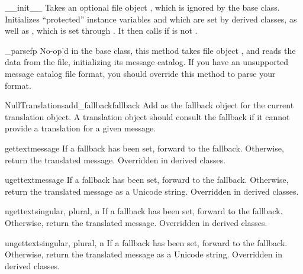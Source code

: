 \begin{methoddesc}[NullTranslations]{__init__}{}
Takes an optional file object , which is ignored by the base
class.  Initializes ``protected'' instance variables  and
 which are set by derived classes, as well as ,
which is set through .  It then calls
 if  is not .
\end{methoddesc}

\begin{methoddesc}[NullTranslations]{_parse}{fp}
No-op'd in the base class, this method takes file object , and
reads the data from the file, initializing its message catalog.  If
you have an unsupported message catalog file format, you should
override this method to parse your format.
\end{methoddesc}

\begin{methoddesc}{NullTranslations}{add_fallback}{fallback}
Add  as the fallback object for the current translation
object. A translation object should consult the fallback if it cannot
provide a translation for a given message.
\end{methoddesc}

\begin{methoddesc}[NullTranslations]{gettext}{message}
If a fallback has been set, forward  to the fallback.
Otherwise, return the translated message.  Overridden in derived classes.
\end{methoddesc}

\begin{methoddesc}[NullTranslations]{ugettext}{message}
If a fallback has been set, forward  to the fallback.
Otherwise, return the translated message as a Unicode string.
Overridden in derived classes.
\end{methoddesc}

\begin{methoddesc}[NullTranslations]{ngettext}{singular, plural, n}
If a fallback has been set, forward  to the fallback.
Otherwise, return the translated message.  Overridden in derived classes.

\end{methoddesc}

\begin{methoddesc}[NullTranslations]{ungettext}{singular, plural, n}
If a fallback has been set, forward  to the fallback.
Otherwise, return the translated message as a Unicode string.
Overridden in derived classes.

\end{methoddesc}

